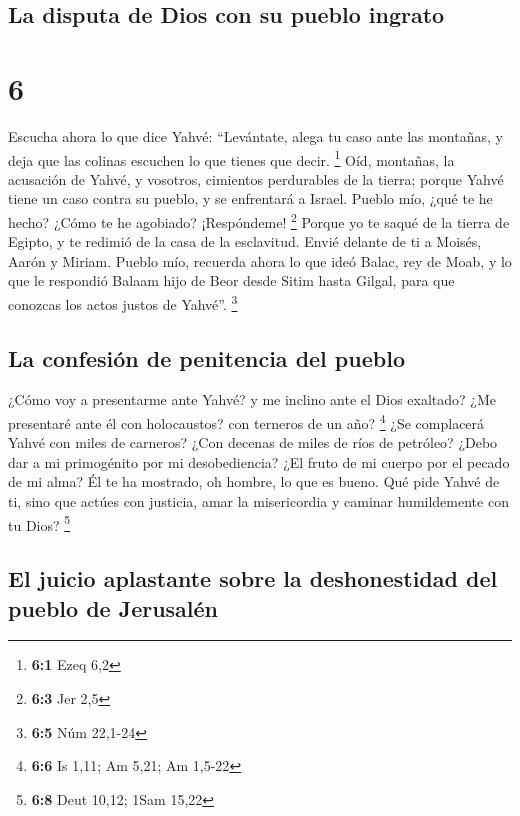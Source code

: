 \hypertarget{la-disputa-de-dios-con-su-pueblo-ingrato}{%
\subsection{La disputa de Dios con su pueblo
ingrato}\label{la-disputa-de-dios-con-su-pueblo-ingrato}}

\hypertarget{section-5}{%
\section{6}\label{section-5}}

 Escucha ahora lo que dice Yahvé: ``Levántate, alega tu
caso ante las montañas, y deja que las colinas escuchen lo que tienes
que decir. \footnote{\textbf{6:1} Ezeq 6,2}  Oíd,
montañas, la acusación de Yahvé, y vosotros, cimientos perdurables de la
tierra; porque Yahvé tiene un caso contra su pueblo, y se enfrentará a
Israel.  Pueblo mío, ¿qué te he hecho? ¿Cómo te he
agobiado? ¡Respóndeme! \footnote{\textbf{6:3} Jer 2,5} 
Porque yo te saqué de la tierra de Egipto, y te redimió de la casa de la
esclavitud. Envié delante de ti a Moisés, Aarón y Miriam. 
Pueblo mío, recuerda ahora lo que ideó Balac, rey de Moab, y lo que le
respondió Balaam hijo de Beor desde Sitim hasta Gilgal, para que
conozcas los actos justos de Yahvé''. \footnote{\textbf{6:5} Núm 22,1-24}

\hypertarget{la-confesiuxf3n-de-penitencia-del-pueblo}{%
\subsection{La confesión de penitencia del
pueblo}\label{la-confesiuxf3n-de-penitencia-del-pueblo}}

 ¿Cómo voy a presentarme ante Yahvé? y me inclino ante el
Dios exaltado? ¿Me presentaré ante él con holocaustos? con terneros de
un año? \footnote{\textbf{6:6} Is 1,11; Am 5,21; Am 1,5-22}
 ¿Se complacerá Yahvé con miles de carneros? ¿Con decenas
de miles de ríos de petróleo? ¿Debo dar a mi primogénito por mi
desobediencia? ¿El fruto de mi cuerpo por el pecado de mi alma?
 Él te ha mostrado, oh hombre, lo que es bueno. Qué pide
Yahvé de ti, sino que actúes con justicia, amar la misericordia y
caminar humildemente con tu Dios? \footnote{\textbf{6:8} Deut 10,12;
  1Sam 15,22}

\hypertarget{el-juicio-aplastante-sobre-la-deshonestidad-del-pueblo-de-jerusaluxe9n}{%
\subsection{El juicio aplastante sobre la deshonestidad del pueblo de
Jerusalén}\label{el-juicio-aplastante-sobre-la-deshonestidad-del-pueblo-de-jerusaluxe9n}}

